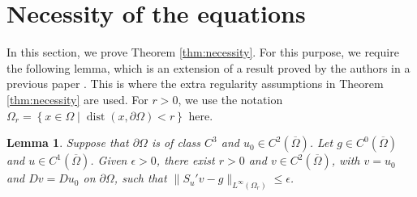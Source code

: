 \documentclass[a4paper]{article}
\DeclareMathOperator{\dist}{dist}
\newcommand{\set}[2]{\left\{ #1 \mid #2 \right\}}
\newtheorem{lemma}[theorem]{Lemma}
\theoremstyle{remark}
\begin{document}
\section{Necessity of the equations}

In this section, we prove Theorem \ref{thm:necessity}. For this purpose, we
require the following lemma, which is an extension of a result proved by the
authors in a previous paper \cite[Lemma 8]{Katzourakis-Moser:19}. This is
where the extra regularity assumptions in Theorem \ref{thm:necessity} are
used. For $r > 0$, we use the notation
$\Omega_r = \set{x \in \Omega}{\dist(x, \partial \Omega) < r}$ here.

\begin{lemma} \label{lem:boundary_behaviour}
Suppose that $\partial \Omega$ is of class $C^3$ and $u_0 \in C^2(\overline{\Omega})$.
Let $g \in C^0(\overline{\Omega})$ and $u \in C^1(\overline{\Omega})$.
Given $\epsilon > 0$, there exist $r > 0$ and $v \in C^2(\overline{\Omega})$,
with $v = u_0$ and $Dv = Du_0$ on $\partial \Omega$, such that
$\|S_u' v - g\|_{L^\infty(\Omega_r)} \le \epsilon$.
\end{lemma}
\end{document}
